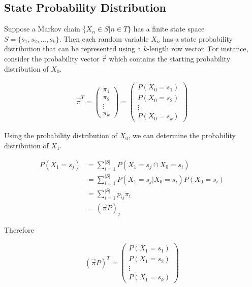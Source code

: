 \documentclass[a4paper,12pt]{article}
\theoremstyle{definition}
\begin{document}
\subsection*{State Probability Distribution}

Suppose a Markov chain $\{X_n \in S|n \in T\}$ has a finite state space $S = \{s_1, s_2,..., s_k\}$. Then each random 
variable $X_n$ has a state probability distribution that can be represented using a $k$-length row vector. For instance, 
consider the probability vector $\vec{\pi}$ which contains the starting probability distribution of $X_0$.
	
	\begin{equation*}
	\begin{aligned}
		\vec{\pi}^T = \begin{pmatrix}
		 \pi_1 \\
		 \pi_2 \\ 
		 \vdots \\
		 \pi_k
		 \end{pmatrix} = \begin{pmatrix}
		 P(X_0 = s_1) \\
		 P(X_0 = s_2) \\ 
		 \vdots \\
		 P(X_0 = s_k)
		 \end{pmatrix}
	\end{aligned}
	\end{equation*}		
	
Using the probability distribution of $X_0$, we can determine the probability distribution of $X_1$.

	\begin{equation*}
	\begin{aligned}
		P(X_1 = s_j) &= \sum_{i=1}^{|S|} P(X_1 = s_j \cap X_0 = s_i) \\
				 	 &= \sum_{i=1}^{|S|} P(X_1 = s_j | X_0 = s_i)P(X_0 = s_i) \\
			     	 &= \sum_{i=1}^{|S|} p_{ij}\pi_i \\
			     	 &= (\vec{\pi}P)_j
	\end{aligned}
	\end{equation*}	
			     	 
	Therefore
	
	\begin{equation*}
	\begin{aligned}
		 (\vec{\pi}P)^T =
		 \begin{pmatrix}
		 P(X_1 = s_1) \\
		 P(X_1 = s_2) \\ 
		 \vdots \\
		 P(X_1 = s_k)
		 \end{pmatrix}
	\end{aligned}
	\end{equation*}
	
\end{document}
